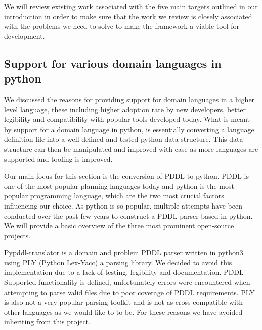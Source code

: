 We will review existing work associated with the five main targets outlined in our introduction in order to make sure that the work we review is closely associated with the problems we need to solve to make the framework a viable tool for development.

\subsection{Support for various domain languages in python}
We discussed the reasons for providing support for domain languages in a higher level language, these including higher adoption rate by new developers, better legibility and compatibility with popular tools developed today. What is meant by support for a domain language in python, is essentially converting a language definition file into a well defined and tested python data structure. This data structure can then be manipulated and improved with ease as more languages are supported and tooling is improved.

Our main focus for this section is the conversion of PDDL to python. PDDL is one of the most popular planning languages today and python is the most popular programming language, which are the two most crucial factors influencing our choice. As python is so popular, multiple attempts have been conducted over the past few years to construct a PDDL parser based in python. We will provide a basic overview of the three most prominent open-source projects.

Pypddl-translator \cite{ssardina20:online} is a domain and problem PDDL parser written in python3 using PLY (Python Lex-Yacc) a parsing library. We decided to avoid this implementation due to a lack of testing, legibility and documentation. PDDL Supported functionality is defined, unfortunately errors were encountered when attempting to parse valid files due to poor coverage of PDDL requirements. PLY is also not a very popular parsing toolkit and is not as cross compatible with other languages as we would like to to be. For these reasons we have avoided inheriting from this project.

